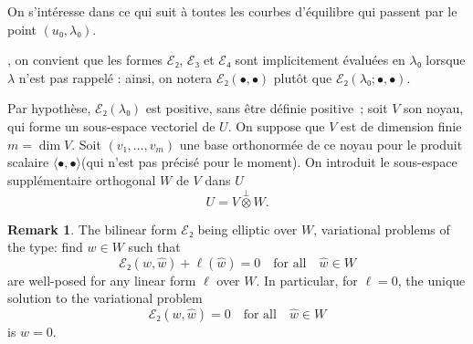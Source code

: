 \documentclass[12pt, final]{scrartcl}
\theoremstyle{definition}
\newtheorem{remark}{Remark}
\begin{document}
On s'intéresse dans ce qui suit à toutes les courbes d'équilibre qui passent par
le point $(u₀, λ₀)$.

, on
convient que les formes $ℰ₂$, $ℰ₃$ et $ℰ₄$ sont implicitement évaluées en
$λ₀$ lorsque $λ$ n'est pas rappelé : ainsi, on notera $ℰ₂(•, •)$ plutôt
que $ℰ₂(λ₀ ; •, •)$.

Par hypothèse, $ℰ₂(λ₀)$ est positive, sans être définie
positive~; soit $V$ son noyau, qui forme un sous-espace vectoriel de $U$. On
suppose que $V$ est de dimension finie $m = \dim V$. Soit
$(v₁, \ldots, v_m)$ une base orthonormée de ce noyau pour le produit scalaire
$〈 •, • 〉$(qui n'est pas précisé pour le moment). On introduit le
sous-espace supplémentaire orthogonal $W$ de $V$ dans $U$
\begin{equation}
  U = V \overset{\perp}{\otimes} W.
\end{equation}

\begin{remark}
  \label{rem:20220902095055}
  The bilinear form $ℰ₂$ being elliptic over $W$, variational problems of the
  type: find $w ∈ W$ such that
  \begin{equation}
    ℰ₂(w, \hat{w})+\ell(\hat{w}) = 0 \quad \text{for all} \quad \hat{w}∈W
  \end{equation}
  are well-posed for any linear form $\ell$ over $W$. In particular, for
  $\ell=0$, the unique solution to the variational problem
  \begin{equation}
    ℰ₂(w, \hat{w}) = 0 \quad \text{for all} \quad \hat{w}∈W
  \end{equation}
  is $w = 0$.
\end{remark}
\end{document}
